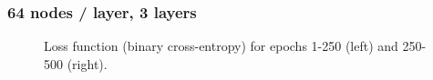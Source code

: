 \documentclass{beamer}
\begin{document}
\begin{frame}
  \frametitle{64 nodes / layer, 3 layers}

  \begin{figure}[htb]
    \centering
    \caption{Loss function (binary cross-entropy) for epochs 1-250 (left) and 250-500 (right).}
  \end{figure}

\end{frame}
\end{document}
